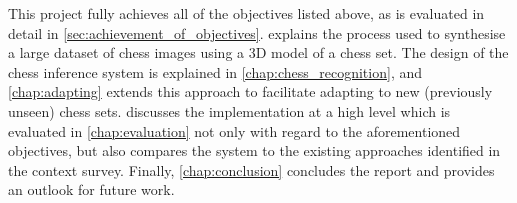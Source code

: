 This project fully achieves all of the objectives listed above, as is evaluated in detail in \cref{sec:achievement_of_objectives}.
 explains the process used to synthesise a large dataset of chess images using a 3D model of a chess set.
The design of the chess inference system is explained in \cref{chap:chess_recognition}, and \cref{chap:adapting} extends this approach to facilitate adapting to new (previously unseen) chess sets.
 discusses the implementation at a high level which is evaluated in \cref{chap:evaluation} not only with regard to the aforementioned objectives, but also compares the system to the existing approaches identified in the context survey.
Finally, \cref{chap:conclusion} concludes the report and provides an outlook for future work.

